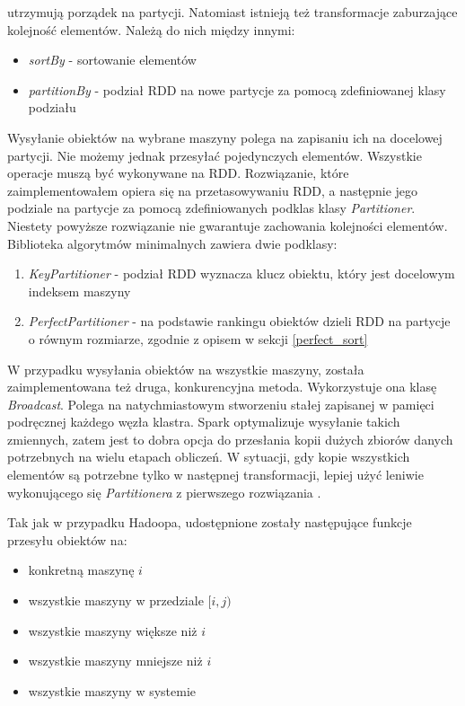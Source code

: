 \documentclass{pracamgr}
\begin{document}
 utrzymują porządek na partycji. Natomiast istnieją też transformacje zaburzające kolejność elementów. Należą do nich między innymi:
 \begin{itemize}
     \item \textit{sortBy} - sortowanie elementów
     \item \textit{partitionBy} - podział RDD na nowe partycje za pomocą zdefiniowanej klasy podziału
 \end{itemize}

Wysyłanie obiektów na wybrane maszyny polega na zapisaniu ich na docelowej partycji. Nie możemy jednak przesyłać pojedynczych elementów. Wszystkie operacje muszą być wykonywane na RDD. Rozwiązanie, które zaimplementowałem opiera się na przetasowywaniu RDD, a następnie jego podziale na partycje za pomocą zdefiniowanych podklas klasy \textit{Partitioner}. Niestety powyższe rozwiązanie nie gwarantuje zachowania kolejności elementów. Biblioteka algorytmów minimalnych zawiera dwie podklasy:
\begin{enumerate}
    \item \textit{KeyPartitioner} - podział RDD wyznacza klucz obiektu, który jest docelowym indeksem maszyny
    \item \textit{PerfectPartitioner} - na podstawie rankingu obiektów dzieli RDD na partycje o równym rozmiarze, zgodnie z opisem w sekcji \ref{perfect_sort}
\end{enumerate}

W przypadku wysyłania obiektów na wszystkie maszyny, została zaimplementowana też druga, konkurencyjna metoda. Wykorzystuje ona klasę \textit{Broadcast}. Polega na natychmiastowym stworzeniu stałej zapisanej w pamięci podręcznej każdego węzła klastra. Spark optymalizuje wysyłanie takich zmiennych, zatem jest to dobra opcja do przesłania kopii dużych zbiorów danych potrzebnych na wielu etapach obliczeń. W sytuacji, gdy kopie wszystkich elementów są potrzebne tylko w następnej transformacji, lepiej użyć leniwie wykonującego się \textit{Partitionera} z pierwszego rozwiązania \cite{spark_documentation}.

Tak jak w przypadku Hadoopa, udostępnione zostały następujące funkcje przesyłu obiektów na:
\begin{itemize}
    \item konkretną maszynę \(i\)
    \item wszystkie maszyny w przedziale \([i, j)\)
    \item wszystkie maszyny większe niż \(i\)
    \item wszystkie maszyny mniejsze niż \(i\)
    \item wszystkie maszyny w systemie
\end{itemize}
\end{document}

